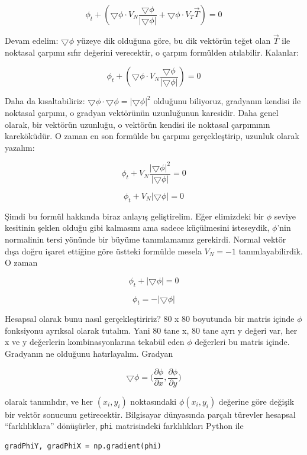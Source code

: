 \documentclass[12pt,fleqn]{article}\usepackage{../../common}
\begin{document}
$$ \phi_t + (\bigtriangledown \phi \cdot
V_N\frac{\bigtriangledown\phi}{|\bigtriangledown\phi|} + \bigtriangledown
\phi \cdot V_T\vec{T}) = 0 $$

Devam edelim: $\bigtriangledown \phi$ yüzeye dik olduğuna göre, bu dik vektörün
teğet olan $\vec{T}$ ile noktasal çarpımı sıfır değerini verecektir, o çarpım
formülden atılabilir. Kalanlar:

$$ \phi_t + (\bigtriangledown \phi \cdot 
V_N\frac{\bigtriangledown\phi}{|\bigtriangledown\phi|}) = 0 $$

Daha da kısaltabiliriz: $\bigtriangledown \phi \cdot \bigtriangledown \phi
= |\bigtriangledown \phi|^2$ olduğunu biliyoruz, gradyanın kendisi ile
noktasal çarpımı, o gradyan vektörünün uzunluğunun karesidir. Daha genel
olarak, bir vektörün uzunluğu, o vektörün kendisi ile noktasal çarpımının
kareköküdür. O zaman en son formülde bu çarpımı gerçekleştirip, uzunluk
olarak yazalım:

$$ \phi_t + V_N\frac{|\bigtriangledown\phi|^2}{|\bigtriangledown\phi|} = 0  $$

$$ \phi_t + V_N |\bigtriangledown\phi| = 0  $$

Şimdi bu formül hakkında biraz anlayış geliştirelim. Eğer elimizdeki
bir $\phi$ seviye kesitinin şeklen olduğu gibi kalmasını ama sadece
küçülmesini isteseydik, $\phi$'nin normalinin tersi yönünde bir büyüme
tanımlamamız gerekirdi. Normal vektör dışa doğru işaret ettiğine göre
üstteki formülde mesela $V_N = -1$ tanımlayabilirdik. O zaman

$$ \phi_t +  |\bigtriangledown\phi| = 0 $$

$$ \phi_t = - |\bigtriangledown\phi|   $$

Hesapsal olarak bunu nasıl gerçekleştiririz? 80 x 80 boyutunda bir
matris içinde $\phi$ fonksiyonu ayrıksal olarak tutalım. Yani 80 tane
x, 80 tane ayrı y değeri var, her x ve y değerlerin kombinasyonlarına
tekabül eden $\phi$ değerleri bu matris içinde. Gradyanın ne olduğunu
hatırlayalım. Gradyan

$$ 
\bigtriangledown \phi = \bigg(
\frac{\partial \phi}{\partial x},
\frac{\partial \phi}{\partial y} \bigg)
$$

olarak tanımlıdır, ve her $(x_i,y_i)$ noktasındaki $\phi(x_i,y_i)$
değerine göre değişik bir vektör sonucunu getirecektir. Bilgisayar
dünyasında parçalı türevler hesapsal ``farklılıklara'' dönüşürler,
\verb!phi! matrisindeki farklılıkları Python ile

\begin{verbatim}
gradPhiY, gradPhiX = np.gradient(phi)
\end{verbatim}
\end{document}
